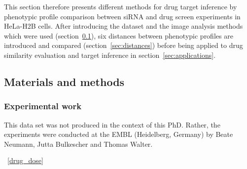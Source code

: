 This section therefore presents different methods for drug target inference by phenotypic profile comparison between siRNA and drug screen experiments in HeLa-H2B cells. After introducing the dataset and the image analysis methods which were used (section~\ref{sec:math_methods_ds}), six distances between phenotypic profiles are introduced and compared (section~\ref{sec:distances}) before being applied to drug similarity evaluation and target inference in section~\ref{sec:applications}.

\subsection{Materials and methods}
\label{sec:math_methods_ds}
\subsubsection{Experimental work}
This data set was not produced in the context of this PhD. Rather, the
experiments were conducted at the EMBL (Heidelberg, Germany) by Beate
Neumann, Jutta Bulkescher and Thomas Walter. 

~\ref{drug_dose} 


